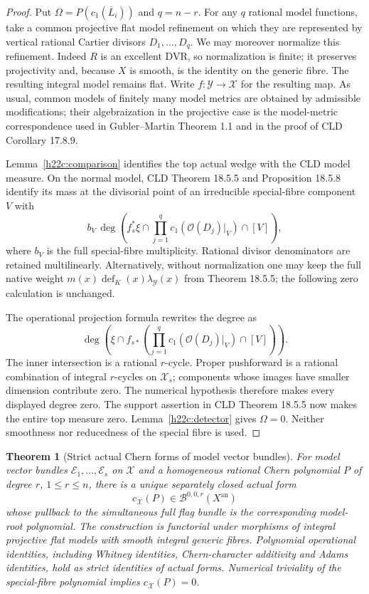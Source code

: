 \documentclass[11pt,a4paper]{article}
\newtheorem{theorem}{Theorem}[section]
\theoremstyle{definition}
\theoremstyle{remark}
\begin{document}
\begin{proof}
Put $\Omega=P(c_1(\overline L_i))$ and $q=n-r$.  For any $q$ rational
model functions, take a common projective flat model refinement on
which they are represented by vertical rational Cartier divisors
$D_1,\ldots,D_q$.  We may moreover normalize this refinement.
Indeed $R$ is an excellent DVR, so normalization is finite; it
preserves projectivity and, because $X$ is smooth, is the identity
on the generic fibre.  The resulting integral model remains flat.
Write $f:\mathcal Y\to\mathcal X$ for the resulting map.  As usual,
common models of finitely many model metrics are obtained by
admissible modifications; their algebraization in the projective
case is the model-metric correspondence used in Gubler--Martin
Theorem 1.1 and in the proof of CLD Corollary 17.8.9.

Lemma~\ref{h22c:comparison} identifies the top actual wedge with the
CLD model measure.  On the normal model, CLD Theorem 18.5.5 and
Proposition 18.5.8 identify its mass at the divisorial point of an
irreducible special-fibre component $V$ with
\[
 b_V\,\deg\!\left(
     f_s^*\xi\cap
     \prod_{j=1}^q c_1(\mathcal O(D_j)|_V)\cap[V]\right),
\]
where $b_V$ is the full special-fibre multiplicity.  Rational divisor
denominators are retained multilinearly.  Alternatively, without
normalization one may keep the full native weight
$m(x)\operatorname{def}_K(x)\lambda_{\mathcal Y}(x)$ from
Theorem 18.5.5; the following zero calculation is unchanged.

The operational projection formula rewrites the degree as
\[
 \deg\!\left(\xi\cap f_{s*}
       \left(\prod_{j=1}^q c_1(\mathcal O(D_j)|_V)\cap[V]\right)\right).
\]
The inner intersection is a rational $r$-cycle.  Proper pushforward
is a rational combination of integral $r$-cycles on $\mathcal X_s$;
components whose images have smaller dimension contribute zero.
The numerical hypothesis therefore makes every displayed degree
zero.  The support assertion in CLD Theorem 18.5.5 now makes the
entire top measure zero.  Lemma~\ref{h22c:detector} gives $\Omega=0$.
Neither smoothness nor reducedness of the special fibre is used.
\end{proof}

\begin{theorem}[Strict actual Chern forms of model vector bundles]
\label{h22c:chern}
For model vector bundles $\mathcal E_1,\ldots,\mathcal E_s$ on
$\mathcal X$ and a homogeneous rational Chern polynomial $P$ of
degree $r$, $1\le r\le n$, there is a unique separately closed
actual form
\[
                c_{\mathcal X}(P)\in\mathcal B^{0,0,r}(X^{\mathrm{an}})
\]
whose pullback to the simultaneous full flag bundle is the
corresponding model-root polynomial.  The construction is functorial
under morphisms of integral projective flat models with smooth
integral generic fibres.  Polynomial operational identities, including
Whitney identities, Chern-character additivity and Adams identities,
hold as strict identities of actual forms.  Numerical triviality
of the special-fibre polynomial implies $c_{\mathcal X}(P)=0$.
\end{theorem}
\end{document}
